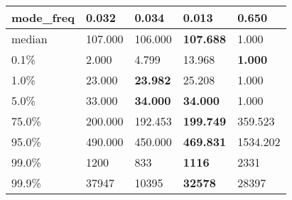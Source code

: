 \begin{table}[H]
\begin{tabular}{|l|m{10em}|m{10em}|m{10em}|m{10em}|}
\hline mode\_freq & 0.032 & \bfseries 0.034 & 0.013 & \cellcolor[rgb]{0.9, 0.54, 0.52} 0.650 \\
\hline median & 107.000 & 106.000 & \bfseries 107.688 & \cellcolor[rgb]{0.9, 0.54, 0.52} 1.000 \\
\hline 0.1\% & 2.000 & 4.799 & \cellcolor[rgb]{0.9, 0.54, 0.52} 13.968 & \bfseries 1.000 \\
\hline 1.0\% & 23.000 & \bfseries 23.982 & 25.208 & \cellcolor[rgb]{0.9, 0.54, 0.52} 1.000 \\
\hline 5.0\% & 33.000 & \bfseries 34.000 & \bfseries 34.000 & \cellcolor[rgb]{0.9, 0.54, 0.52} 1.000 \\
\hline 75.0\% & 200.000 & 192.453 & \bfseries 199.749 & \cellcolor[rgb]{0.9, 0.54, 0.52} 359.523 \\
\hline 95.0\% & 490.000 & 450.000 & \bfseries 469.831 & \cellcolor[rgb]{0.9, 0.54, 0.52} 1534.202 \\
\hline 99.0\% & 1200 & 833 & \bfseries 1116 & \cellcolor[rgb]{0.9, 0.54, 0.52} 2331 \\
\hline 99.9\% & 37947 & \cellcolor[rgb]{0.9, 0.54, 0.52} 10395 & \bfseries 32578 & 28397 \\
\hline
\end{tabular}
\end{table}
